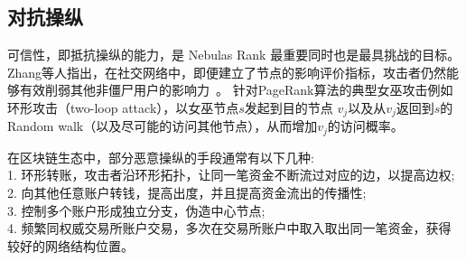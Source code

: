 
\subsection{对抗操纵}
可信性，即抵抗操纵的能力，是 Nebulas Rank 最重要同时也是最具挑战的目标。Zhang等人指出，在社交网络中，即便建立了节点的影响评价指标，攻击者仍然能够有效削弱其他非僵尸用户的影响力~\cite{zhang2016truetop}。
针对PageRank算法的典型女巫攻击例如环形攻击（two-loop attack），以女巫节点$s$发起到目的节点
$v_j$以及从$v_j$返回到$s$的Random walk（以及尽可能的访问其他节点），从而增加$v_j$的访问概率。


在区块链生态中，部分恶意操纵的手段通常有以下几种:\\
1. 环形转账，攻击者沿环形拓扑，让同一笔资金不断流过对应的边，以提高边权;\\
2. 向其他任意账户转钱，提高出度，并且提高资金流出的传播性;\\
3. 控制多个账户形成独立分支，伪造中心节点;\\
4. 频繁同权威交易所账户交易，多次在交易所账户中取入取出同一笔资金，获得较好的网络结构位置。\\




